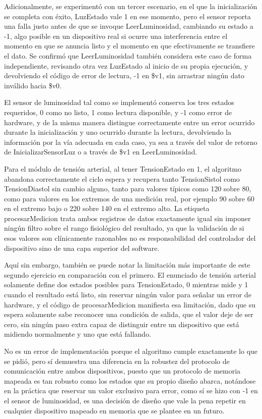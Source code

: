 \documentclass[12pt, letterpaper]{article}
\begin{document}
Adicionalmente, se experimentó con un tercer escenario, en el que la inicialización se completa con éxito, LuzEstado vale 1 en ese momento, pero el sensor reporta una falla justo antes de que se invoque LeerLuminosidad, cambiando su estado a -1, algo posible en un dispositivo real si ocurre una interferencia entre el momento en que se anuncia listo y el momento en que efectivamente se transfiere el dato. Se confirmó que LeerLuminosidad también considera este caso de forma independiente, revisando otra vez LuzEstado al inicio de su propia ejecución, y devolviendo el código de error de lectura, -1 en \$v1, sin arrastrar ningún dato inválido hacia \$v0.

El sensor de luminosidad tal como se implementó conserva los tres estados requeridos, 0 como no listo, 1 como lectura disponible, y -1 como error de hardware, y de la misma manera distingue correctamente entre un error ocurrido durante la inicialización y uno ocurrido durante la lectura, devolviendo la información por la vía adecuada en cada caso, ya sea a través del valor de retorno de InicializarSensorLuz o a través de \$v1 en LeerLuminosidad.

Para el módulo de tensión arterial, al tener TensionEstado en 1, el algoritmo abandona correctamente el ciclo espera y recupera tanto TensionSistol como TensionDiastol sin cambio alguno, tanto para valores típicos como 120 sobre 80, como para valores en los extremos de una medición real, por ejemplo 90 sobre 60 en el extremo bajo o 220 sobre 140 en el extremo alto. La etiqueta procesarMedicion trata ambos registros de datos exactamente igual sin imponer ningún filtro sobre el rango fisiológico del resultado, ya que la validación de si esos valores son clínicamente razonables no es responsabilidad del controlador del dispositivo sino de una capa superior del software.

Aquí sin embargo, también se puede notar la limitación más importante de este segundo ejercicio en comparación con el primero. El enunciado de tensión arterial solamente define dos estados posibles para TensionEstado, 0 mientras mide y 1 cuando el resultado está listo, sin reservar ningún valor para señalar un error de hardware, y el código de procesarMedicion manifiesta esa limitación, dado que su espera solamente sabe reconocer una condición de salida, que el valor deje de ser cero, sin ningún paso extra capaz de distinguir entre un dispositivo que está midiendo normalmente y uno que está fallando.

No es un error de implementación porque el algoritmo cumple exactamente lo que se pidió, pero sí demuestra una diferencia en la robustez del protocolo de comunicación entre ambos dispositivos, puesto que un protocolo de memoria mapeada es tan robusto como los estados que su propio diseño abarca, notándose en la práctica que reservar un valor exclusivo para error, como sí se hizo con -1 en el sensor de luminosidad, es una decisión de diseño que vale la pena repetir en cualquier dispositivo mapeado en memoria que se plantee en un futuro.
\end{document}
